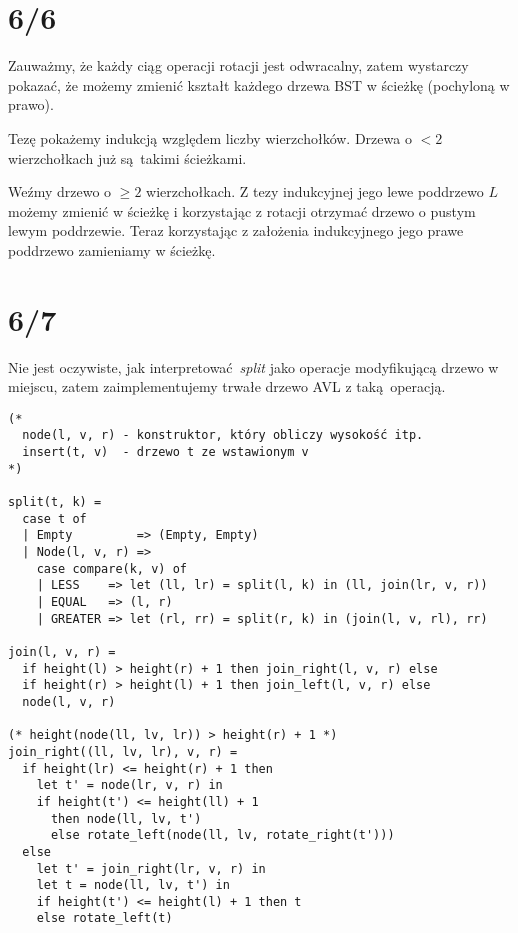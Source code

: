 \documentclass[a4paper, 12pt]{article}
\title{}
\author{Wiktor Kuchta}
\date{\vspace{-4ex}}
\newcommand{\+}{\enspace}
\begin{document}
\maketitle

\iffalse
\section*{6/1}

\begin{algorithm}
	\begin{algorithmic}

	\end{algorithmic}
\end{algorithm}
\fi


\section*{6/6}
Zauważmy, że każdy ciąg operacji rotacji jest odwracalny,
zatem wystarczy pokazać, że możemy zmienić kształt każdego drzewa BST
w ścieżkę (pochyloną w prawo).

Tezę pokażemy indukcją względem liczby wierzchołków.
Drzewa o $<2$ wierzchołkach już są takimi ścieżkami.

Weźmy drzewo o $≥2$ wierzchołkach.
Z tezy indukcyjnej jego lewe poddrzewo $L$ możemy
zmienić w ścieżkę i korzystając z rotacji otrzymać drzewo o pustym lewym
poddrzewie.
Teraz korzystając z założenia indukcyjnego jego prawe poddrzewo zamieniamy
w ścieżkę.

\newpage
\section*{6/7}
Nie jest oczywiste, jak interpretować \textit{split} jako operacje modyfikującą
drzewo w miejscu, zatem zaimplementujemy trwałe drzewo AVL z taką operacją.
\begin{verbatim}
(*
  node(l, v, r) - konstruktor, który obliczy wysokość itp.
  insert(t, v)  - drzewo t ze wstawionym v
*)

split(t, k) =
  case t of
  | Empty         => (Empty, Empty)
  | Node(l, v, r) =>
    case compare(k, v) of
    | LESS    => let (ll, lr) = split(l, k) in (ll, join(lr, v, r))
    | EQUAL   => (l, r)
    | GREATER => let (rl, rr) = split(r, k) in (join(l, v, rl), rr)

join(l, v, r) =
  if height(l) > height(r) + 1 then join_right(l, v, r) else
  if height(r) > height(l) + 1 then join_left(l, v, r) else
  node(l, v, r)

(* height(node(ll, lv, lr)) > height(r) + 1 *)
join_right((ll, lv, lr), v, r) =
  if height(lr) <= height(r) + 1 then
    let t' = node(lr, v, r) in
    if height(t') <= height(ll) + 1
      then node(ll, lv, t')
      else rotate_left(node(ll, lv, rotate_right(t')))
  else
    let t' = join_right(lr, v, r) in
    let t = node(ll, lv, t') in
    if height(t') <= height(l) + 1 then t
    else rotate_left(t)
\end{verbatim}
\end{document}
